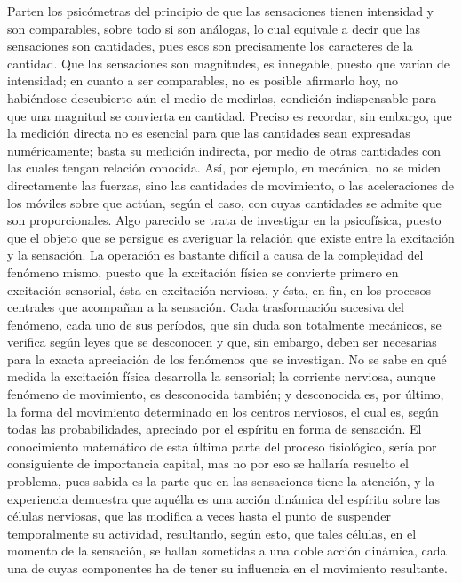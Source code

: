 \documentclass[a4paper, 12pt]{article}
\begin{document}
Parten los psicómetras del principio de que las sensaciones tienen intensidad y son comparables, sobre todo si son análogas, lo cual equivale a decir que las sensaciones son cantidades, pues esos son precisamente los caracteres de la cantidad. Que las sensaciones son magnitudes, es innegable, puesto que varían de intensidad; en cuanto a ser comparables, no es posible afirmarlo hoy, no habiéndose descubierto aún el medio de medirlas, condición indispensable para que una magnitud se convierta en cantidad. Preciso es recordar, sin embargo, que la medición directa no es esencial para que las cantidades sean expresadas numéricamente; basta su medición indirecta, por medio de otras cantidades con las cuales tengan relación conocida. Así, por ejemplo, en mecánica, no se miden directamente las fuerzas, sino las cantidades de movimiento, o las aceleraciones de los móviles sobre que actúan, según el caso, con cuyas cantidades se admite que son proporcionales. Algo parecido se trata de investigar en la psicofísica, puesto que el objeto que se persigue es averiguar la relación que existe entre la excitación y la sensación. La operación es bastante difícil a causa de la complejidad del fenómeno mismo, puesto que la excitación física se convierte primero en excitación sensorial, ésta en excitación nerviosa, y ésta, en fin, en los procesos centrales que acompañan a la sensación. Cada trasformación sucesiva del fenómeno, cada uno de sus períodos, que sin duda son totalmente mecánicos, se verifica según leyes que se desconocen y que, sin embargo, deben ser necesarias para la exacta apreciación de los fenómenos que se investigan. No se sabe en qué medida la excitación física desarrolla la sensorial; la corriente nerviosa, aunque fenómeno de movimiento, es desconocida también; y desconocida es, por último, la forma del movimiento determinado en los centros nerviosos, el cual es, según todas las probabilidades, apreciado por el espíritu en forma de sensación. El conocimiento matemático de esta última parte del proceso fisiológico, sería por consiguiente de importancia capital, mas no por eso se hallaría resuelto el problema, pues sabida es la parte que en las sensaciones tiene la atención, y la experiencia demuestra que aquélla es una acción dinámica del espíritu sobre las células nerviosas, que las modifica a veces hasta el punto de suspender temporalmente su actividad, resultando, según esto, que tales células, en el momento de la sensación, se hallan sometidas a una doble acción dinámica, cada una de cuyas componentes ha de tener su influencia en el movimiento resultante.
\end{document}
